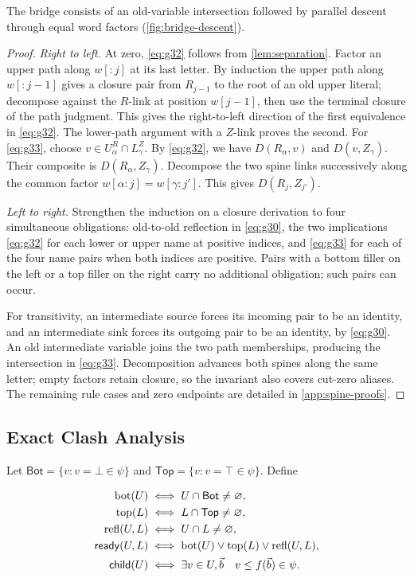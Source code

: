 The bridge consists of an old-variable intersection followed by parallel
descent through equal word factors (\cref{fig:bridge-descent}).


\begin{proof}\emph{Right to left.} At zero, \eqref{eq:g32} follows from \cref{lem:separation}. Factor
an upper path along $w[:j]$ at its last letter. By induction the upper path along $w[:j-1]$
gives a closure pair from $R_{j-1}$ to the root of an old upper literal;
decompose against the $R$-link at position $w[j-1]$, then use the
terminal closure of the path judgment. This gives the right-to-left direction
of the first equivalence in \eqref{eq:g32}. The lower-path argument with a $Z$-link proves the second.
For \eqref{eq:g33}, choose $v\in U^R_\alpha\cap L^Z_\gamma$. By \eqref{eq:g32}, we have
$D(R_\alpha,v)$ and $D(v,Z_\gamma)$. Their composite is $D(R_\alpha,Z_\gamma)$.
Decompose the two spine links successively along the common factor
$w[\alpha:j]=w[\gamma:j']$. This gives $D(R_j,Z_{j'})$.

\emph{Left to right.} Strengthen the induction on a closure
derivation to four simultaneous obligations: old-to-old reflection in \eqref{eq:g30},
the two implications \eqref{eq:g32} for each lower or upper name at positive indices,
and \eqref{eq:g33} for each of the four name pairs when both indices are
positive. Pairs with a bottom filler on the left or a top filler on the
right carry no additional obligation; such pairs can occur.

For transitivity, an intermediate source forces its incoming pair to
be an identity, and an intermediate sink forces its outgoing pair to be
an identity, by \eqref{eq:g30}. An old intermediate variable joins the
two path memberships, producing the intersection in \eqref{eq:g33}.
Decomposition advances both spines along the same letter; empty factors
retain closure, so the invariant also covers cut-zero aliases.
The remaining rule cases and zero endpoints are detailed in
\cref{app:spine-proofs}.
\end{proof}

\subsection{Exact Clash Analysis}\label{sec:events}
Let $\mathsf{Bot}=\{v:v=\bot\in\psi\}$ and
$\mathsf{Top}=\{v:v=\top\in\psi\}$. Define

\begin{equation}\label{eq:g34}
\begin{aligned}
 \operatorname{bot}(U)&\iff U\cap\mathsf{Bot}\ne\varnothing,\\
 \operatorname{top}(L)&\iff L\cap\mathsf{Top}\ne\varnothing,\\
 \operatorname{refl}(U,L)&\iff U\cap L\ne\varnothing,\\
 \mathsf{ready}(U,L)&\iff
 \operatorname{bot}(U)\lor\operatorname{top}(L)\lor
 \operatorname{refl}(U,L),\\
 \mathsf{child}(U)&\iff
 \exists v\in U,\vec b\quad v\le f(\vec b)\in\psi.
 \end{aligned}
\end{equation}

